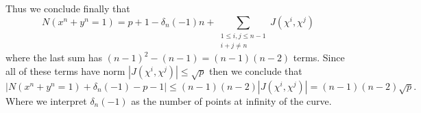 Thus we conclude finally that
\[
    N(x^n + y^n = 1) = p+1-\delta_n(-1)n
    + \sum_{\substack{1 \leqslant i, j \leqslant n-1 \\ i + j \neq  n}} J(\chi^i,
    \chi^j)
\]
where the last sum has \((n-1)^2 - (n-1)  = (n-1)(n-2)\) terms. Since all of
these terms have norm \(|J(\chi^i, \chi^j)| \leqslant \sqrt{p}\) then we
conclude that
\[
    |N(x^n + y^n = 1) + \delta_n(-1) -p -1| \leqslant (n-1)(n-2) |J(\chi^i,
    \chi^j)| = (n-1)(n-2)\sqrt{p}.
\]
Where we interpret \(\delta_n(-1)\) as the number of points at infinity of the
curve.
